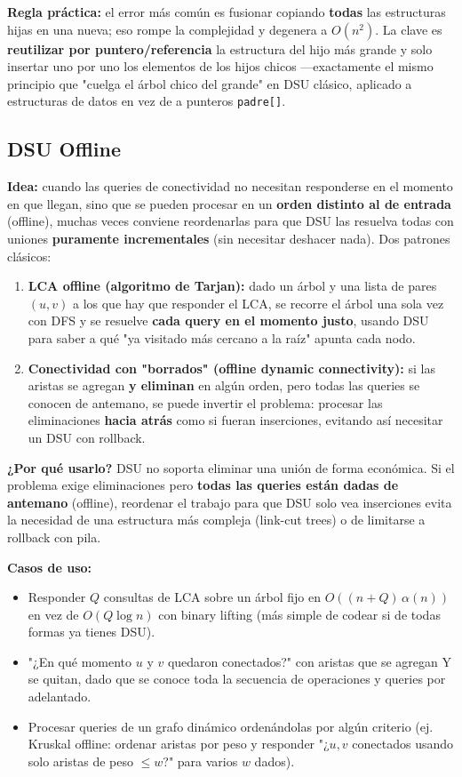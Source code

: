 \documentclass[10pt,a4paper,twocolumn]{article}
\begin{document}
\textbf{Regla práctica:} el error más común es fusionar copiando
\textbf{todas} las estructuras hijas en una nueva; eso rompe la
complejidad y degenera a $O(n^2)$. La clave es \textbf{reutilizar por
puntero/referencia} la estructura del hijo más grande y solo insertar
uno por uno los elementos de los hijos chicos —exactamente el mismo
principio que "cuelga el árbol chico del grande" en DSU clásico,
aplicado a estructuras de datos en vez de a punteros \texttt{padre[]}.

\subsection{DSU Offline}

\textbf{Idea:} cuando las queries de conectividad no necesitan
responderse en el momento en que llegan, sino que se pueden procesar
en un \textbf{orden distinto al de entrada} (offline), muchas veces
conviene reordenarlas para que DSU las resuelva todas con uniones
\textbf{puramente incrementales} (sin necesitar deshacer nada). Dos
patrones clásicos:

\begin{enumerate}
    \item \textbf{LCA offline (algoritmo de Tarjan):} dado un árbol y
    una lista de pares $(u, v)$ a los que hay que responder el LCA,
    se recorre el árbol una sola vez con DFS y se resuelve
    \textbf{cada query en el momento justo}, usando DSU para saber a
    qué "ya visitado más cercano a la raíz" apunta cada nodo.
    \item \textbf{Conectividad con "borrados" (offline dynamic
    connectivity):} si las aristas se agregan \textbf{y eliminan} en
    algún orden, pero todas las queries se conocen de antemano, se
    puede invertir el problema: procesar las eliminaciones
    \textbf{hacia atrás} como si fueran inserciones, evitando así
    necesitar un DSU con rollback.
\end{enumerate}

\textbf{¿Por qué usarlo?} DSU no soporta eliminar una unión de forma
económica. Si el problema exige eliminaciones pero \textbf{todas las
queries están dadas de antemano} (offline), reordenar el trabajo para
que DSU solo vea inserciones evita la necesidad de una estructura más
compleja (link-cut trees) o de limitarse a rollback con pila.

\textbf{Casos de uso:}

\begin{itemize}
    \item Responder $Q$ consultas de LCA sobre un árbol fijo en
    $O((n+Q)\,\alpha(n))$ en vez de $O(Q \log n)$ con binary lifting
    (más simple de codear si de todas formas ya tienes DSU).
    \item "¿En qué momento $u$ y $v$ quedaron conectados?" con
    aristas que se agregan Y se quitan, dado que se conoce toda la
    secuencia de operaciones y queries por adelantado.
    \item Procesar queries de un grafo dinámico ordenándolas por
    algún criterio (ej. Kruskal offline: ordenar aristas por peso y
    responder "¿$u,v$ conectados usando solo aristas de peso
    $\le w$?" para varios $w$ dados).
\end{itemize}
\end{document}
